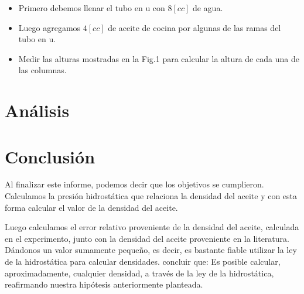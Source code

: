 \documentclass[a4paper, 12p]{article}
\begin{document}
\begin{itemize}
      \item Primero debemos llenar el tubo en u con $8[cc]$ de agua.
      
      \item Luego agregamos $4[cc]$ de aceite de cocina por algunas de las ramas del tubo en u.
      
      \item Medir las alturas mostradas en la Fig.1 para calcular la altura de cada una de las columnas.
      
\end{itemize}

\section{Análisis}

\section{Conclusión}

Al finalizar este informe, podemos decir que los objetivos se cumplieron. Calculamos la presión hidrostática que relaciona la densidad del aceite y con esta forma calcular el valor de la densidad del aceite.

Luego calculamos el error relativo proveniente de la densidad del aceite, calculada en el experimento, junto con la densidad del aceite proveniente en la literatura. Dándonos un valor sumamente pequeño, es decir, es bastante fiable utilizar la ley de la hidrostática para calcular densidades.
concluir que:
Es posible calcular, aproximadamente, cualquier densidad, a través de la ley de la hidrostática, reafirmando nuestra hipótesis anteriormente planteada.






      
      
      
      
      
      
      
      
      
      
      
      
      
      
\end{document}
